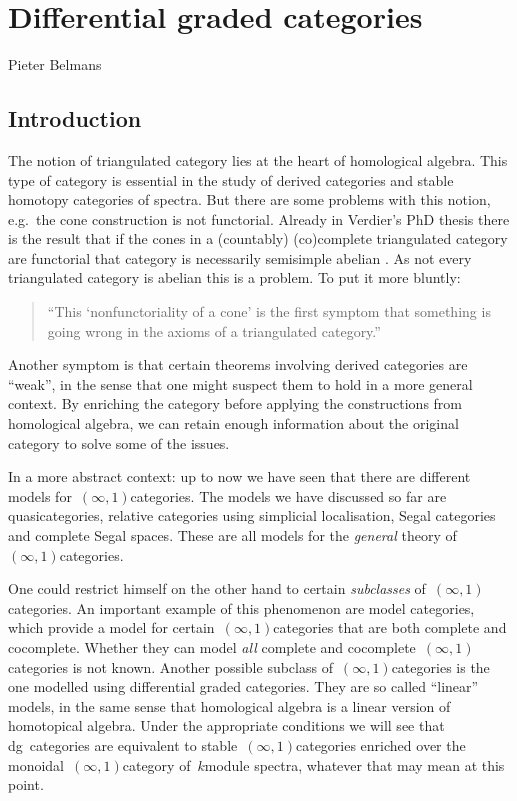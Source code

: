 \chapter{Differential graded categories}
\begin{flushright}
  Pieter Belmans
\end{flushright}

\section{Introduction}
The notion of triangulated category lies at the heart of homological algebra. This type of category is essential in the study of derived categories and stable homotopy categories of spectra. But there are some problems with this notion, e.g.\ the cone construction is not functorial. Already in Verdier's PhD thesis there is the result that if the cones in a (countably) (co)complete triangulated category are functorial that category is necessarily semisimple abelian \cite[proposition II.1.2.13]{verdierphd}. As not every triangulated category is abelian \cite[exercise 1.4.5]{weibel} this is a problem. To put it more bluntly:
\begin{quote}
  ``This `nonfunctoriality of a cone' is the first symptom that something is going wrong in the axioms of a triangulated category.''
\end{quote}
\begin{flushright}
  \cite[section IV.7]{gelfandmanin}
\end{flushright}
Another symptom is that certain theorems involving derived categories are ``weak'', in the sense that one might suspect them to hold in a more general context. By enriching the category before applying the constructions from homological algebra, we can retain enough information about the original category to solve some of the issues.

In a more abstract context: up to now we have seen that there are different models for~$(\infty,1)$\dash categories. The models we have discussed so far are quasicategories, relative categories using simplicial localisation, Segal categories and complete Segal spaces. These are all models for the \emph{general} theory of~$(\infty,1)$\dash categories.

One could restrict himself on the other hand to certain \emph{subclasses} of~$(\infty,1)$\dash categories. An important example of this phenomenon are model categories, which provide a model for certain~$(\infty,1)$\dash categories that are both complete and cocomplete. Whether they can model \emph{all} complete and cocomplete~$(\infty,1)$\dash categories is not known. Another possible subclass of~$(\infty,1)$\dash categories is the one modelled using differential graded categories. They are so called ``linear'' models, in the same sense that homological algebra is a linear version of homotopical algebra. Under the appropriate conditions we will see that dg~categories are equivalent to stable~$(\infty,1)$\dash categories enriched over the monoidal~$(\infty,1)$\dash category of~$k$\dash module spectra, whatever that may mean at this point.


